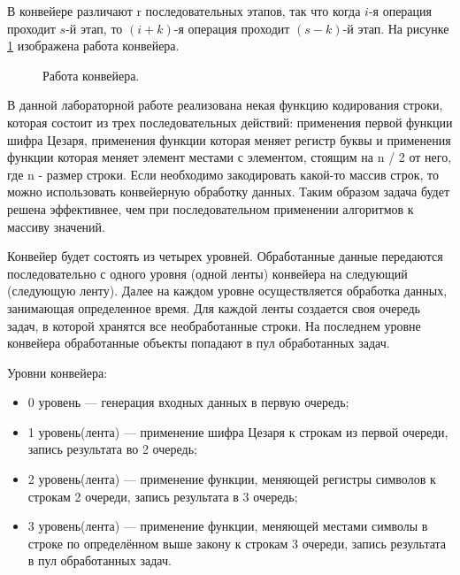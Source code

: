 \documentclass[12pt]{report}
\begin{document}
В конвейере различают r последовательных этапов, так что когда $i$-я операция проходит $s$-й этап, то $(i+k)$-я операция проходит $(s-k)$-й этап. На рисунке \ref{fig:conv} изображена работа конвейера.

\begin{figure}[h]
	\caption{Работа конвейера.}
	\label{fig:conv}
\end{figure}

В данной лабораторной работе реализована некая функцию кодирования строки, которая состоит из трех последовательных действий: применения первой функции шифра Цезаря, применения функции которая меняет регистр буквы и применения функции которая меняет элемент местами с элементом, стоящим на n / 2 от него, где n - размер строки. Если необходимо закодировать какой-то массив строк, то можно использовать конвейерную обработку данных. Таким образом задача будет решена эффективнее, чем при последовательном применении алгоритмов к массиву значений.  

Конвейер будет состоять из четырех уровней. Обработанные данные передаются последовательно с одного уровня (одной ленты) конвейера на следующий (следующую ленту). Далее на каждом уровне осуществляется обработка данных, занимающая определенное время. Для каждой ленты создается своя очередь задач, в которой хранятся все необработанные строки. На последнем уровне конвейера обработанные объекты попадают в пул обработанных задач.

Уровни конвейера: 
\begin{itemize}
	\item 0 уровень — генерация входных данных в первую очередь;
	
	\item 1 уровень(лента) — применение шифра Цезаря к строкам из первой очереди, запись результата во 2 очередь; 
	
	\item 2 уровень(лента) — применение функции, меняющей регистры символов к строкам 2 очереди, запись результата в 3 очередь;
	
	\item 3 уровень(лента) — применение функции, меняющей местами символы в строке по определённом выше закону  к строкам 3 очереди, запись результата в пул обработанных задач.
\end{itemize}
\end{document}
